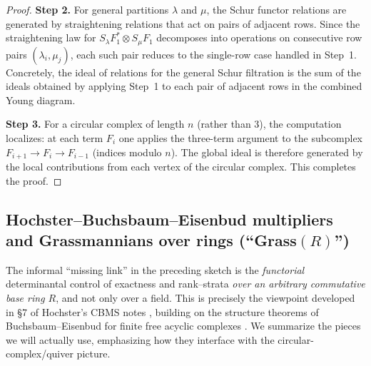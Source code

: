 \documentclass[11pt,oneside]{amsbook}
\numberwithin{equation}{section}
\theoremstyle{plain}
\theoremstyle{definition}
\theoremstyle{remark}
\begin{document}
\begin{proof}
			\medskip\noindent\textbf{Step 2.}
For general partitions $\lambda$ and $\mu$, the Schur functor relations are generated by straightening relations that act on pairs of adjacent rows.  Since the straightening law for $S_\lambda F_1^*\otimes S_\mu F_1$ decomposes into operations on consecutive row pairs $(\lambda_i,\mu_j)$, each such pair reduces to the single-row case handled in Step~1.  Concretely, the ideal of relations for the general Schur filtration is the sum of the ideals obtained by applying Step~1 to each pair of adjacent rows in the combined Young diagram.

			\medskip\noindent\textbf{Step 3.}
For a circular complex of length $n$ (rather than $3$), the computation localizes: at each term $F_i$ one applies the three-term argument to the subcomplex $F_{i+1}\to F_i\to F_{i-1}$ (indices modulo $n$).  The global ideal is therefore generated by the local contributions from each vertex of the circular complex.  This completes the proof.
	
		\end{proof}
		
		
		
\subsection{Hochster--Buchsbaum--Eisenbud multipliers and Grassmannians over rings (``Grass$(R)$'')}\label{subsec:hochster-grassR}

The informal ``missing link'' in the preceding sketch is the \emph{functorial} determinantal control of
exactness and rank--strata \emph{over an arbitrary commutative base ring $R$}, and not only over a field.
This is precisely the viewpoint developed in \S7 of Hochster's CBMS notes \cite{HochsterCBMS24}, building on
the structure theorems of Buchsbaum--Eisenbud for finite free acyclic complexes \cite{BuchsbaumEisenbud1974}.
We summarize the pieces we will actually use, emphasizing how they interface with the circular-complex/quiver
picture.
\end{document}
